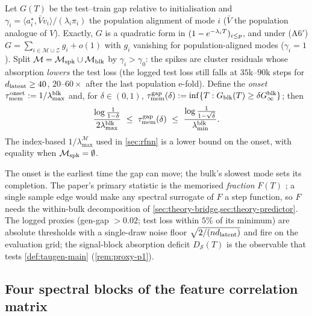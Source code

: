 \begin{definition}\label{def:taumem-main}
Let $G(T)$ be the test--train gap relative to initialisation and $\gamma_i=\langle a_i^\star,\bar Vv_i\rangle/(\lambda_i\pi_i)$ the population alignment of mode $i$ ($\bar V$ the population analogue of $V$). Exactly, $G$ is a quadratic form in $(1-e^{-\lambda_iT})_{i\le p}$, and under (A6$'$) $G=\sum_{i\in\mathcal M\cup\mathcal Z}g_i+o(1)$ with $g_i$ vanishing for population-aligned modes ($\gamma_i=1$). Split $\mathcal M=\mathcal M_{\rm spk}\cup\mathcal M_{\rm blk}$ by $\gamma_i>\gamma_0$: the spikes are cluster residuals whose absorption \emph{lowers} the test loss (the logged test loss still falls at $35$k--$90$k steps for $d_{\mathrm{latent}}\ge40$, $20$--$60\times$ after the last population e-fold). Define the \emph{onset} $\tau_{\mathrm{mem}}^{\rm onset}:=1/\lambda^{\rm blk}_{\max}$ and, for $\delta\in(0,1)$, $\tau_{\mathrm{mem}}^{\rm gap}(\delta):=\inf\{T:G_{\rm blk}(T)\ge\delta G^{\rm blk}_\infty\}$; then
\begin{equation}\label{eq:taumem-bounds-main}
\frac{\log\frac1{1-\delta}}{2\lambda^{\rm blk}_{\max}}\ \le\ \taumem^{\rm gap}(\delta)\ \le\ \frac{\log\frac1{1-\sqrt\delta}}{\lambda^{\rm blk}_{\min}} .
\end{equation}
The index-based $1/\lambda^{\mathcal M}_{\max}$ used in \cref{sec:rfnn} is a lower bound on the onset, with equality when $\mathcal M_{\rm spk}=\emptyset$.
\end{definition}
The onset is the earliest time the gap can move; the bulk's slowest mode sets its completion. The paper's primary statistic is the memorised \emph{fraction} $F(T)$ \citep{somepalli2023diffusion,bonnaire2025}; a single sample edge would make any spectral surrogate of $F$ a step function, so $F$ needs the within-bulk decomposition of \cref{sec:theory-bridge,sec:theory-predictor}. The logged proxies (gen-gap $>0.02$; test loss within $5\%$ of its minimum) are absolute thresholds with a single-draw noise floor $\sqrt{2/(nd_{\mathrm{latent}})}$ and fire on the evaluation grid; the signal-block absorption deficit $D_{\mathcal S}(T)$ is the observable that tests \cref{def:taugen-main} (\cref{rem:proxy-p1}).

\subsection{Four spectral blocks of the feature correlation matrix}
\label{sec:theory-fourbulk}\label{sec:theory-edges}

